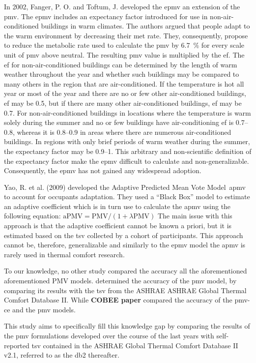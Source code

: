 In 2002, Fanger, P. O. and Toftum, J. developed the \gls{epmv} an extension of the \ac{pmv}.
The \gls{epmv} includes an expectancy factor introduced for use in non-air-conditioned buildings in warm climates.
The authors argued that people adapt to the warm environment by decreasing their \ac{met} rate.
They, consequently, propose to reduce the metabolic rate used to calculate the \ac{pmv} by \qty{6.7}{\percent} for every scale unit of \ac{pmv} above neutral.
The resulting \ac{pmv} value is multiplied by the \ac{ef}.
The \ac{ef} for non-air-conditioned buildings can be determined by the length of warm weather throughout the year and whether such buildings may be compared to many others in the region that are air-conditioned.
If the temperature is hot all year or most of the year and there are no or few other air-conditioned buildings, \ac{ef} may be \num{0.5}, but if there are many other air-conditioned buildings, \ac{ef} may be \num{0.7}.
For non-air-conditioned buildings in locations where the temperature is warm solely during the summer and no or few buildings have air-conditioning \ac{ef} is \numrange{0.7}{0.8}, whereas it is \numrange{0.8}{.9} in areas where there are numerous air-conditioned buildings.
In regions with only brief periods of warm weather during the summer, the expectancy factor may be \numrange{0.9}{1}.
This arbitrary and non-scientific definition of the expectancy factor make the \gls{epmv} difficult to calculate and non-generalizable.
Consequently, the \gls{epmv} has not gained any widespread adoption.

Yao, R. et al. (2009) developed the Adaptive Predicted Mean Vote Model~\gls{apmv} to account for occupants adaptation.
They used a ``Black Box'' model to estimate an adaptive coefficient which is in turn use to calculate the \gls{apmv} using the following equation: $\mathrm{aPMV} = \mathrm{PMV}/(1+\lambda \mathrm{PMV})$
The main issue with this approach is that the adaptive coefficient cannot be known a priori, but it is estimated based on the \ac{tsv} collected by a cohort of participants.
This approach cannot be, therefore, generalizable and similarly to the \gls{epmv} model the \gls{apmv} is rarely used in thermal comfort research.


To our knowledge, no other study compared the accuracy all the aforementioned aforementioned PMV models.
 determined the accuracy of the \ac{pmv} model, by comparing its results with the \ac{tsv} from the ASHRAE ASHRAE Global Thermal Comfort Database II.
While \textbf{COBEE paper} compared the accuracy of the \gls{pmv-ce} and the \ac{pmv} models.

This study aims to specifically fill this knowledge gap by comparing the results of the \ac{pmv} formulations developed over the course of the last years with self-reported \ac{tsv} contained in the ASHRAE Global Thermal Comfort Database II v2.1, referred to as the \gls{db2} thereafter.


